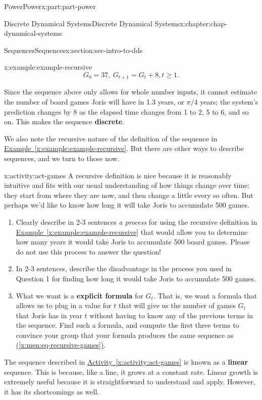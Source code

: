 \documentclass[oneside,10pt,]{book}
\newcommand{\xreffont}{\relax}
\newcommand{\terminology}[1]{\textbf{#1}}
\numberwithin{equation}{section}
\renewcommand{\ge}{\geqslant}
\begin{document}
\begin{partptx}{Power}{}{Power}{}{}{x:part:part-power}
\begin{chapterptx}{Discrete Dynamical Systems}{}{Discrete Dynamical Systems}{}{}{x:chapter:chap-dynamical-systems}
\begin{sectionptx}{Sequences}{}{Sequences}{}{}{x:section:sec-intro-to-dds}
\begin{example}{}{x:example:example-recursive}
\begin{equation}
G_0 = 37, \ G_{t+1} = G_t + 8, t \ge 1.\label{x:men:eq-recursive-games}
\end{equation}
%
\end{example}
Since the sequence above only allows for whole number inputs, it cannot estimate the number of board games Joris will have in 1.3 years, or \(\pi/4\) years; the system's prediction changes by 8 as the elapsed time changes from 1 to 2, 5 to 6, and so on. This makes the sequence \terminology{discrete}.%
\par
We also note the recursive nature of the definition of the sequence in \hyperref[x:example:example-recursive]{Example~{\xreffont\ref{x:example:example-recursive}}}. But there are other ways to describe sequences, and we turn to those now.%
\begin{activity}{}{x:activity:act-games}%
A recursive definition is nice because it is reasonably intuitive and fits with our usual understanding of how things change over time: they start from where they are now, and then change a little every so often. But perhaps we'd like to know how long it will take Joris to accumulate 500 games. %
%
\begin{enumerate}
\item{}Clearly describe in 2-3 sentences \emph{a process} for using the recursive definition in \hyperref[x:example:example-recursive]{Example~{\xreffont\ref{x:example:example-recursive}}} that would allow you to determine how many years it would take Joris to accumulate 500 board games. Please do not use this process to answer the question!%
\item{}In 2-3 sentences, describe the disadvantage in the process you used in Question 1 for finding how long it would take Joris to accumulate 500 games.%
\item{}What we want is a \terminology{explicit formula} for \(G_t\). That is, we want a formula that allows us to plug in a value for \(t\) that will give us the number of games \(G_t\) that Joris has in year \(t\) without having to know any of the previous terms in the sequence. Find such a formula, and compute the first three terms to convince your group that your formula produces the same sequence as \hyperref[x:men:eq-recursive-games]{({\xreffont\ref{x:men:eq-recursive-games}})}.%
\end{enumerate}
\end{activity}%
The sequence described in \hyperref[x:activity:act-games]{Activity~{\xreffont\ref{x:activity:act-games}}} is known as a \terminology{linear} sequence. This is because, like a line, it grows at a constant rate. Linear growth is extremely useful because it is straightforward to understand and apply. However, it has its shortcomings as well.%

\end{sectionptx}
\end{chapterptx}
\end{partptx}
\end{document}
